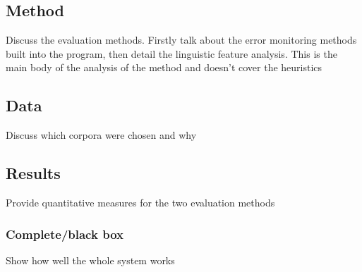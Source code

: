 \subsection{Method}
\label{sec:evaluation:method}
Discuss the evaluation methods.  Firstly talk about the error monitoring methods built into the program, then detail the linguistic feature analysis.  This is the main body of the analysis of the method and doesn't cover the heuristics


\subsection{Data}
\label{sec:evaluation:method}
Discuss which corpora were chosen and why

\subsection{Results}
\label{sec:evaluation:}
Provide quantitative measures for the two evaluation methods
\subsubsection{Complete/black box}
Show how well the whole system works

